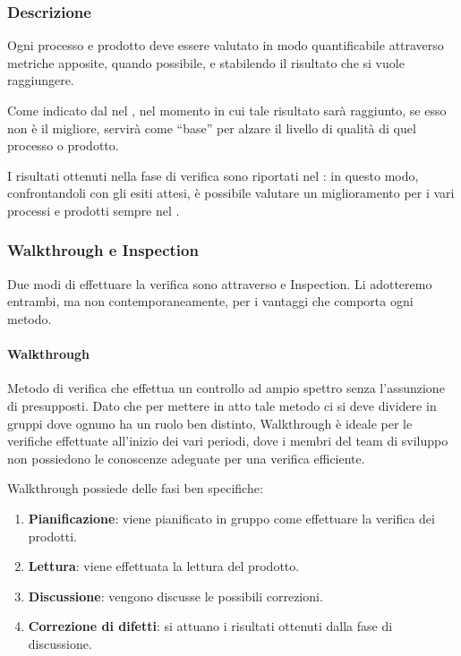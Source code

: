		\subsubsection{Descrizione}
		Ogni processo e prodotto deve essere valutato in modo quantificabile attraverso metriche apposite, quando possibile, e stabilendo il risultato che si vuole
		raggiungere.

		Come indicato dal  nel \Doc{\PdQv}, nel momento in cui tale risultato sarà raggiunto, se esso non è il migliore,
		servirà come ``base'' per alzare il livello di qualità di quel processo o prodotto.

		I risultati ottenuti nella fase di verifica sono riportati nel \PdQ: in questo modo, confrontandoli con gli esiti attesi,
		è possibile valutare un miglioramento per i vari processi e prodotti sempre nel \PdQ.

		\subsubsection{Walkthrough e Inspection}
		Due modi di effettuare la verifica sono attraverso  e Inspection.
		Li adotteremo entrambi, ma non contemporaneamente, per i vantaggi che comporta ogni metodo.

			\paragraph{Walkthrough}
			Metodo di verifica che effettua un controllo ad ampio spettro senza l’assunzione di presupposti. Dato che per mettere in atto tale metodo ci
			si deve dividere in gruppi dove ognuno ha un ruolo ben distinto, Walkthrough è ideale per le verifiche effettuate all'inizio dei vari periodi,
			dove i membri del team di sviluppo non possiedono le conoscenze adeguate per una verifica efficiente.

			Walkthrough possiede delle fasi ben specifiche:

			\begin{enumerate}
				\item \textbf{Pianificazione}: viene pianificato in gruppo come effettuare la verifica dei prodotti.
				\item \textbf{Lettura}: viene effettuata la lettura del prodotto.
				\item \textbf{Discussione}: vengono discusse le possibili correzioni.
				\item \textbf{Correzione di difetti}: si attuano i risultati ottenuti dalla fase di discussione.
			\end{enumerate}

